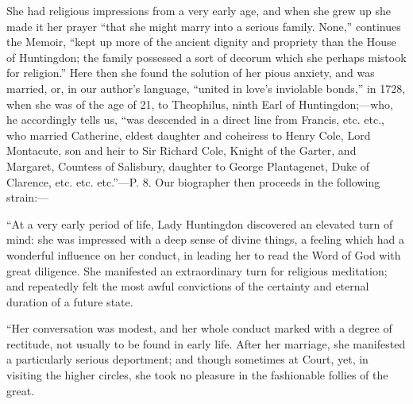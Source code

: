 She had religious impressions from a very early
age, and when she grew up she made it her prayer ``that she might marry
into a serious family. None,'' continues the Memoir, ``kept up more of
the ancient dignity and propriety than the House of Huntingdon; the
family possessed a sort of decorum which she perhaps mistook for
religion.'' Here then she found the solution of her pious anxiety, and
was married, or, in our author's language, ``united in love's
inviolable bonds,'' in 1728, when she was of the age of 21, to
Theophilus, ninth Earl of Huntingdon;—who, he accordingly tells us, ``was
descended in a direct line from Francis, etc. etc., who married
Catherine, eldest daughter and coheiress to Henry Cole, Lord Montacute,
son and heir to Sir Richard Cole, Knight of the Garter, and Margaret,
Countess of Salisbury, daughter to George Plantagenet, Duke of
Clarence, etc. etc. etc.''—P. 8. Our biographer then proceeds in the
following strain:—

``At
a very early period of life, Lady Huntingdon discovered an elevated
turn of mind: she was impressed with a deep sense of divine things, a
feeling which had a wonderful influence on her conduct, in leading her
to read the Word of God with great diligence. She manifested an
extraordinary turn for religious meditation; and repeatedly felt the
most awful convictions of the certainty and eternal duration of a
future state.

``Her
conversation was modest, and her whole conduct marked with a degree of
rectitude, not usually to be found in early life. After her marriage,
she manifested a particularly serious deportment; and though sometimes
at Court, yet, in visiting the higher circles, she took no pleasure in
the fashionable follies of the great.

